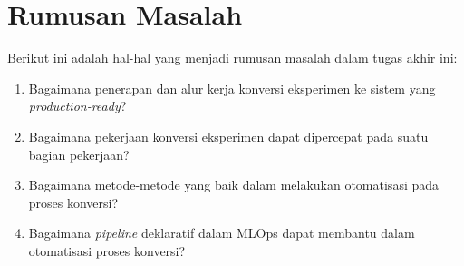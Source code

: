 \section{Rumusan Masalah}

Berikut ini adalah hal-hal yang menjadi rumusan masalah dalam tugas akhir ini:

\begin{enumerate}
    \item Bagaimana penerapan dan alur kerja konversi eksperimen ke sistem yang \textit{production-ready}?
    \item Bagaimana pekerjaan konversi eksperimen dapat dipercepat pada suatu bagian pekerjaan?
    \item Bagaimana metode-metode yang baik dalam melakukan otomatisasi pada proses konversi?
    \item Bagaimana \textit{pipeline} deklaratif dalam MLOps dapat membantu dalam otomatisasi proses konversi?
\end{enumerate}